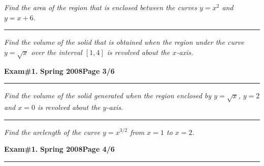 \documentclass[12pt]{article}
\begin{document}
\bigskip
{\problem[10 pts] \em  Find the area of the region that is enclosed between the curves $y=x^2$ and $y=x+6$.} 
\vspace{8.5cm}
\begin{flushright}
\end{flushright}
\hrule
{\problem[10 pts] \em Find the volume of the solid that is obtained when the region under the curve $y=\sqrt{x}$ over the interval $[1,4]$ is revolved about the $x$-axis.}
\vspace{8.5cm}
\begin{flushright}
\end{flushright}
\newpage

\hfill{\large\bf Exam\#1.}\hfill{\large\bf
  Spring 2008}\hfill{\large\bf Page 3/6}\hrule

\bigskip
{\problem[10 pts] \em Find the volume of the solid generated when the region enclosed by $y=\sqrt{x}$, $y=2$ and $x=0$ is revolved about the $y$-axis.}
\vspace{8.5cm}
\begin{flushright}
\end{flushright}
\hrule
{\problem[10 pts] \em Find the arclength of the curve $y=x^{3/2}$ from $x=1$ to $x=2$.}
\vspace{8.5cm}
\begin{flushright}
\end{flushright}
\newpage

\hfill{\large\bf Exam\#1.}\hfill{\large\bf
  Spring 2008}\hfill{\large\bf Page 4/6}\hrule
\end{document}
